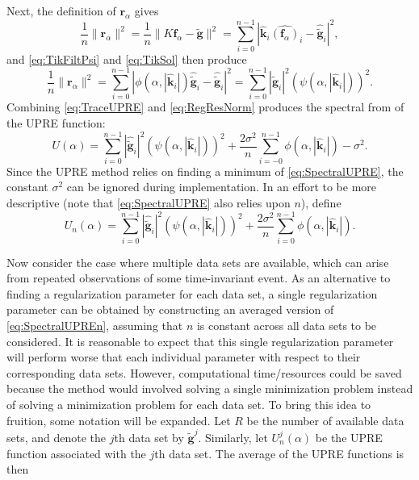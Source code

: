 \documentclass[12pt]{article}
\newcommand{\gnoise}{\widetilde{\mathbf{g}}}
\newcommand{\kdis}{\mathbf{k}}
\newcommand{\kmat}{K}	%
\newcommand{\fdis}{\mathbf{f}}
\newcommand{\regparam}{\alpha}
\newcommand{\freg}{\fdis_{\regparam}}	%
\newcommand{\filt}{\phi}
\newcommand{\mfilt}{\psi}
\newcommand{\noiseSD}{\sigma}	%
\newcommand{\regres}{\mathbf{r}_{\regparam}}	%
\newcommand{\U}{U}	%
\begin{document}
Next, the definition of $\regres$ gives
\[\frac{1}{n}\|\regres\|^2 = \frac{1}{n}\|\kmat\freg - \gnoise\|^2 = \sum_{i = 0}^{n-1} |\widehat{\kdis}_i\widehat{(\freg)}_i - \widehat{\gnoise}_i|^2,\]
and \eqref{eq:TikFiltPsi} and \eqref{eq:TikSol} then produce
\begin{equation}
\frac{1}{n}\|\regres\|^2 = \sum_{i = 0}^{n-1} |\filt(\regparam,|\widehat{\kdis}_i|)\widehat{\gnoise}_i - \widehat{\gnoise}_i|^2 = \sum_{i = 0}^{n-1} |\widehat{\gnoise}_i|^2(\mfilt(\regparam,|\widehat{\kdis}_i|))^2.
\label{eq:RegResNorm}
\end{equation}
Combining \eqref{eq:TraceUPRE} and \eqref{eq:RegResNorm} produces the spectral from of the UPRE function:
\begin{equation}
\U(\regparam) = \sum_{i = 0}^{n-1} |\widehat{\gnoise}_i|^2(\mfilt(\regparam,|\widehat{\kdis}_i|))^2 + \frac{2\noiseSD^2}{n}\sum_{i = -0}^{n-1} \filt(\regparam,|\widehat{\kdis}_i|) - \noiseSD^2.
\label{eq:SpectralUPRE}
\end{equation} 
Since the UPRE method relies on finding a minimum of \eqref{eq:SpectralUPRE}, the constant $\noiseSD^2$ can be ignored during implementation. In an effort to be more descriptive (note that \eqref{eq:SpectralUPRE} also relies upon $n$), define
\begin{equation}
\U_n(\regparam) = \sum_{i = 0}^{n-1} |\widehat{\gnoise}_i|^2(\mfilt(\regparam,|\widehat{\kdis}_i|))^2 + \frac{2\noiseSD^2}{n}\sum_{i = 0}^{n-1} \filt(\regparam,|\widehat{\kdis}_i|).
\label{eq:SpectralUPREn}
\end{equation} \par 
Now consider the case where multiple data sets are available, which can arise from repeated observations of some time-invariant event. As an alternative to finding a regularization parameter for each data set, a single regularization parameter can be obtained by constructing an averaged version of \eqref{eq:SpectralUPREn}, assuming that $n$ is constant across all data sets to be considered. It is reasonable to expect that this single regularization parameter will perform worse that each individual parameter with respect to their corresponding data sets. However, computational time/resources could be saved because the method would involved solving a single minimization problem instead of solving a minimization problem for each data set. To bring this idea to fruition, some notation will be expanded. Let $R$ be the number of available data sets, and denote the $j$th data set by $\gnoise^j$. Similarly, let $\U_n^j(\regparam)$ be the UPRE function associated with the $j$th data set.  The average of the UPRE functions is then 
\end{document}
